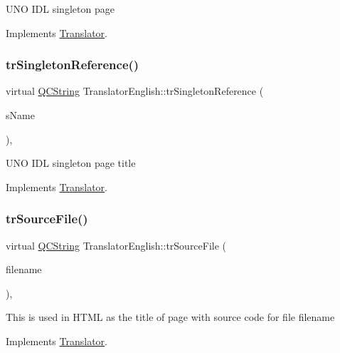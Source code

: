 U\+NO I\+DL singleton page 

Implements \mbox{\hyperlink{class_translator}{Translator}}.

\mbox{\label{class_translator_english_a4fb80aae0c36727d7b93123b656427c2}} 
\subsubsection{\texorpdfstring{trSingletonReference()}{trSingletonReference()}}
{\footnotesize\ttfamily virtual \mbox{\hyperlink{class_q_c_string}{Q\+C\+String}} Translator\+English\+::tr\+Singleton\+Reference (\begin{DoxyParamCaption}\item[{const char $\ast$}]{s\+Name }\end{DoxyParamCaption})\hspace{0.3cm}{\ttfamily [inline]}, {\ttfamily [virtual]}}

U\+NO I\+DL singleton page title 

Implements \mbox{\hyperlink{class_translator}{Translator}}.

\mbox{\label{class_translator_english_ad79d13c3ba84566cd1eafe66ed3e55a6}} 
\subsubsection{\texorpdfstring{trSourceFile()}{trSourceFile()}}
{\footnotesize\ttfamily virtual \mbox{\hyperlink{class_q_c_string}{Q\+C\+String}} Translator\+English\+::tr\+Source\+File (\begin{DoxyParamCaption}\item[{\mbox{\hyperlink{class_q_c_string}{Q\+C\+String}} \&}]{filename }\end{DoxyParamCaption})\hspace{0.3cm}{\ttfamily [inline]}, {\ttfamily [virtual]}}

This is used in H\+T\+ML as the title of page with source code for file filename 

Implements \mbox{\hyperlink{class_translator}{Translator}}.

